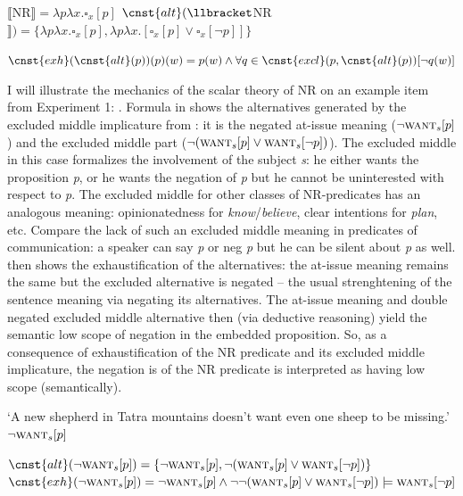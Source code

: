 \documentclass[output=paper,
]{langscibook}
\begin{document}
\ea \ea \label{ex-25-a} $\llbracket$NR$\rrbracket = \lambda p\lambda x.\square_x[p]$
\ex \label{ex-25-b} $\cnst{alt}(\llbracket$NR$\rrbracket)=\{\lambda p\lambda x.\square_x[p],\lambda p\lambda x.[\square_x[p] \vee \square_x[\neg p]]\}$
\z
\z

\ea \label{ex-26} $\cnst{exh}(\cnst{alt}(p))(p)(w) = p(w) \wedge \forall q \in \cnst{excl}(p,\cnst{alt}(p))[\neg q(w)]$
\z

\noindent I will illustrate the mechanics of the scalar theory of NR on an example item from Experiment 1: . Formula in  shows the alternatives generated by the excluded middle implicature from : it is the negated at-issue meaning ($\neg \textsc{want}_s[p]$) and the excluded middle part ($\neg(\textsc{want}_s[p] \vee \textsc{want}_s[\neg p])$). The excluded middle in this case formalizes the involvement of the subject \textit{s}: he either wants the proposition \textit{p}, or he wants the negation of \textit{p} but he cannot be uninterested with respect to \textit{p}. The excluded middle for other classes of NR-predicates has an analogous meaning: opinionatedness for \textit{know}/\textit{believe}, clear intentions for \textit{plan}, etc. Compare the lack of such an excluded middle meaning in predicates of communication: a speaker can say \textit{p} or neg \textit{p} but he can be silent about \textit{p} as well.  then shows the exhaustification of the alternatives: the at-issue meaning remains the same but the excluded alternative is negated -- the usual strenghtening of the sentence meaning via negating its alternatives. The at-issue meaning and double negated excluded middle alternative then (via deductive reasoning) yield the semantic low scope of negation in the embedded proposition. So, as a consequence of exhaustification of the NR predicate and its excluded middle implicature, the negation is of the NR predicate is interpreted as having low scope (semantically).

\ea\label{ex-27} `A new shepherd in Tatra mountains doesn't want even one sheep to be missing.'\\ $\neg \textsc{want}_s[p]$
\z

\ea \ea \label{ex-28-a}$\cnst{alt}(\neg \textsc{want}_s[p])=\{\neg \textsc{want}_s[p], \neg(\textsc{want}_s[p] \vee \textsc{want}_s[\neg p])\}$
\ex \label{ex-28-b}$\cnst{exh}(\neg \textsc{want}_s[p])=\neg \textsc{want}_s[p] \wedge \neg \neg(\textsc{want}_s[p] \vee \textsc{want}_s[\neg p]) \models \textsc{want}_s[\neg p]$
\z
\z
\end{document}
